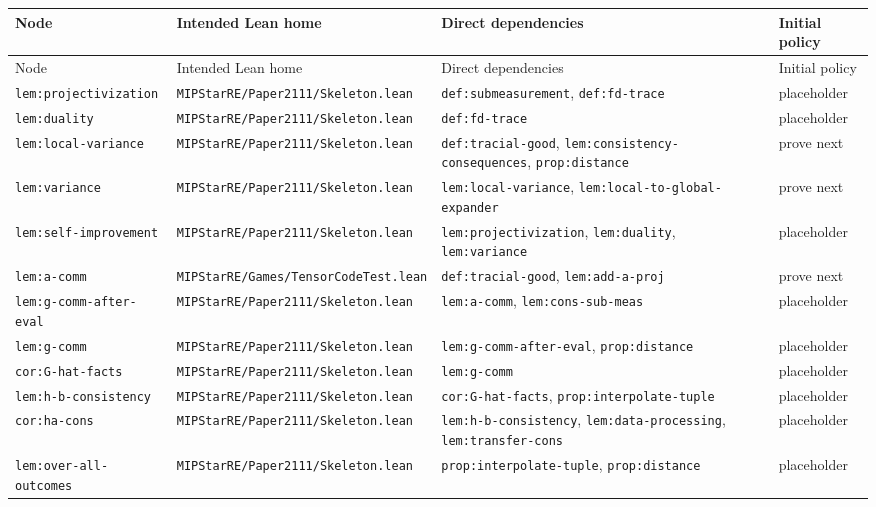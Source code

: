 \documentclass{article}
\theoremstyle{remark}
\begin{document}
\small
\begin{longtable}{L{0.18\textwidth}L{0.25\textwidth}L{0.32\textwidth}L{0.13\textwidth}}
\toprule
Node & Intended Lean home & Direct dependencies & Initial policy \\
\midrule
\endfirsthead
\toprule
Node & Intended Lean home & Direct dependencies & Initial policy \\
\midrule
\endhead
\texttt{lem:projectivization} & \texttt{MIPStarRE/Paper2111/Skeleton.lean} & \texttt{def:submeasurement}, \texttt{def:fd-trace} & placeholder \\
\texttt{lem:duality} & \texttt{MIPStarRE/Paper2111/Skeleton.lean} & \texttt{def:fd-trace} & placeholder \\
\texttt{lem:local-variance} & \texttt{MIPStarRE/Paper2111/Skeleton.lean} & \texttt{def:tracial-good}, \texttt{lem:consistency-consequences}, \texttt{prop:distance} & prove next \\
\texttt{lem:variance} & \texttt{MIPStarRE/Paper2111/Skeleton.lean} & \texttt{lem:local-variance}, \texttt{lem:local-to-global-expander} & prove next \\
\texttt{lem:self-improvement} & \texttt{MIPStarRE/Paper2111/Skeleton.lean} & \texttt{lem:projectivization}, \texttt{lem:duality}, \texttt{lem:variance} & placeholder \\
\texttt{lem:a-comm} & \texttt{MIPStarRE/Games/TensorCodeTest.lean} & \texttt{def:tracial-good}, \texttt{lem:add-a-proj} & prove next \\
\texttt{lem:g-comm-after-eval} & \texttt{MIPStarRE/Paper2111/Skeleton.lean} & \texttt{lem:a-comm}, \texttt{lem:cons-sub-meas} & placeholder \\
\texttt{lem:g-comm} & \texttt{MIPStarRE/Paper2111/Skeleton.lean} & \texttt{lem:g-comm-after-eval}, \texttt{prop:distance} & placeholder \\
\texttt{cor:G-hat-facts} & \texttt{MIPStarRE/Paper2111/Skeleton.lean} & \texttt{lem:g-comm} & placeholder \\
\texttt{lem:h-b-consistency} & \texttt{MIPStarRE/Paper2111/Skeleton.lean} & \texttt{cor:G-hat-facts}, \texttt{prop:interpolate-tuple} & placeholder \\
\texttt{cor:ha-cons} & \texttt{MIPStarRE/Paper2111/Skeleton.lean} & \texttt{lem:h-b-consistency}, \texttt{lem:data-processing}, \texttt{lem:transfer-cons} & placeholder \\
\texttt{lem:over-all-outcomes} & \texttt{MIPStarRE/Paper2111/Skeleton.lean} & \texttt{prop:interpolate-tuple}, \texttt{prop:distance} & placeholder \\

\end{longtable}
\end{document}
